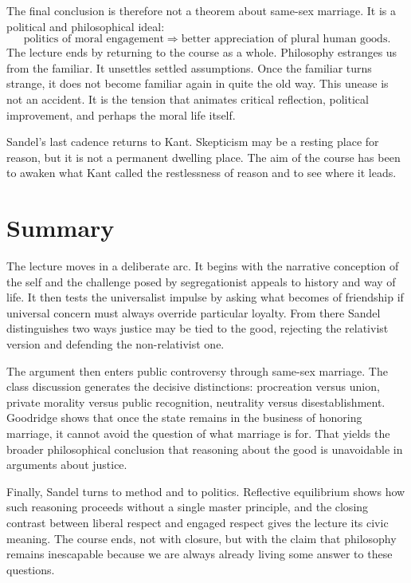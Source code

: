 The final conclusion is therefore not a theorem about same-sex marriage. It is a political and philosophical ideal:
\begin{equation}
\text{politics of moral engagement}
\Longrightarrow
\text{better appreciation of plural human goods}.
\end{equation}
The lecture ends by returning to the course as a whole. Philosophy estranges us from the familiar. It unsettles settled assumptions. Once the familiar turns strange, it does not become familiar again in quite the old way. This unease is not an accident. It is the tension that animates critical reflection, political improvement, and perhaps the moral life itself.

Sandel's last cadence returns to Kant. Skepticism may be a resting place for reason, but it is not a permanent dwelling place. The aim of the course has been to awaken what Kant called the restlessness of reason and to see where it leads.

\section{Summary}

The lecture moves in a deliberate arc. It begins with the narrative conception of the self and the challenge posed by segregationist appeals to history and way of life. It then tests the universalist impulse by asking what becomes of friendship if universal concern must always override particular loyalty. From there Sandel distinguishes two ways justice may be tied to the good, rejecting the relativist version and defending the non-relativist one.

The argument then enters public controversy through same-sex marriage. The class discussion generates the decisive distinctions: procreation versus union, private morality versus public recognition, neutrality versus disestablishment. Goodridge shows that once the state remains in the business of honoring marriage, it cannot avoid the question of what marriage is for. That yields the broader philosophical conclusion that reasoning about the good is unavoidable in arguments about justice.

Finally, Sandel turns to method and to politics. Reflective equilibrium shows how such reasoning proceeds without a single master principle, and the closing contrast between liberal respect and engaged respect gives the lecture its civic meaning. The course ends, not with closure, but with the claim that philosophy remains inescapable because we are always already living some answer to these questions.